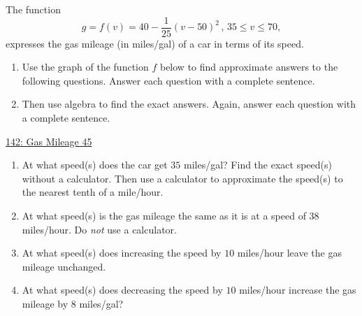 \documentclass{ximera}
\begin{document}
\begin{example} \label{ExmMDM3er3r3}

The function 
\[
    g = f(v) = 40-\frac{1}{25}\left(v-50\right)^{2} \, , \, 35\leq v \leq 70 ,
\]
expresses the gas mileage (in miles/gal) of a car in terms of its speed.

\begin{enumerate}

\item Use the graph of the function $f$ below to find approximate answers to the following questions. Answer each question with a complete sentence.

\item Then use algebra to find the exact answers. Again, answer each question with a complete sentence.

\end{enumerate}

\begin{onlineOnly}
    \begin{center}
\end{center}
\end{onlineOnly}

\href{https://www.desmos.com/calculator/rmpah0rcez}{142: Gas Mileage 45}

\begin{enumerate}
\item At what speed(s) does the car get $35$ miles/gal? Find the exact speed(s) without a calculator. Then use a calculator to approximate the speed(s) to the nearest tenth of a mile/hour.

\item At what speed(s) is the gas mileage the same as it is at a speed of $38$ miles/hour. Do \emph{not} use a calculator.

\item At what speed(s) does increasing the speed by $10$ miles/hour leave the gas mileage unchanged. 

\item  At what speed(s) does decreasing the speed by $10$ miles/hour increase the gas mileage by $8$ miles/gal?
\end{enumerate}
\end{example}
\end{document}
